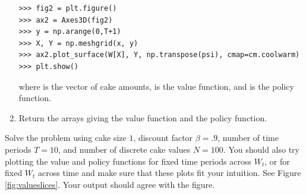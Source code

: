 \begin{problem}
\begin{enumerate}
\begin{lstlisting}
>>> fig2 = plt.figure()
>>> ax2 = Axes3D(fig2)
>>> y = np.arange(0,T+1)
>>> X, Y = np.meshgrid(x, y)
>>> ax2.plot_surface(W[X], Y, np.transpose(psi), cmap=cm.coolwarm)
>>> plt.show()
\end{lstlisting}
where  is the vector of cake amounts,  is the value function, and  is the policy function.

\item Return the arrays giving the value function and the policy function.
\end{enumerate}

Solve the problem using cake size $1$, discount factor $\beta = .9$, number of time periods $T = 10$, and number of
discrete cake values $N = 100$. You should also try plotting the value and policy functions for fixed time periods across
$W_t$, or for fixed $W_t$
across time and make sure that these plots fit your intuition. See Figure \ref{fig:valueslices}. Your output should
agree with the figure.
\end{problem}

